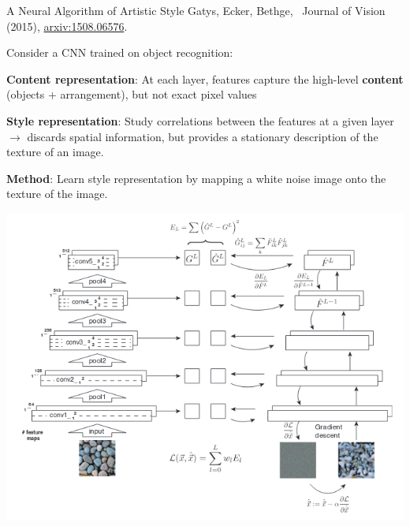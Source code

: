 \documentclass[12pt,t]{beamer}
\begin{document}
\begin{frame}{A Neural Algorithm of Artistic Style}
Gatys, Ecker,  Bethge,  Journal of Vision (2015), \href{https://arxiv.org/abs/1508.06576}{\color{blue}arxiv:1508.06576}.

\bigskip

Consider a CNN trained on object recognition:

\bigskip

{\bf Content representation}: At each layer, features capture the high-level {\bf content} (objects + arrangement), but not exact pixel values 

\bigskip

{\bf Style representation}: 
Study correlations between the features at a given layer  $\longrightarrow$ discards spatial information, but provides a stationary description of the texture of an image.  

\bigskip

{\bf Method}:  Learn style representation by mapping a white noise image onto the texture of the image.

\end{frame}

\begin{frame}
 \centerline{
\includegraphics[height=0.9\textheight]{./images/texture-analysis.png} 
}
\end{frame}
\end{document}
